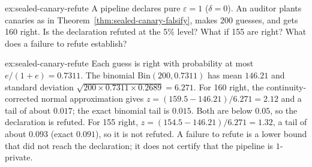 
\begin{pdexercise}[kind=Check,rating=2]{ex:sealed-canary-refute}
A pipeline declares pure $\varepsilon=1$ ($\delta=0$). An auditor plants
canaries as in Theorem~\ref{thm:sealed-canary-falsify}, makes 200 guesses, and
gets 160 right. Is the declaration refuted at the 5\% level? What if 155 are
right? What does a failure to refute establish?
\end{pdexercise}
\begin{pdsolution}{ex:sealed-canary-refute}
Each guess is right with probability at most $e/(1+e)=0.7311$. The binomial
$\mathrm{Bin}(200,0.7311)$ has mean $146.21$ and standard deviation
$\sqrt{200\times0.7311\times0.2689}=6.271$. For 160 right, the continuity-corrected
normal approximation gives $z=(159.5-146.21)/6.271=2.12$ and a tail of about
$0.017$; the exact binomial tail is $0.015$. Both are below $0.05$, so the
declaration is refuted. For 155 right, $z=(154.5-146.21)/6.271=1.32$, a tail
of about $0.093$ (exact $0.091$), so it is not refuted. A failure to refute is
a lower bound that did not reach the declaration; it does not certify that the
pipeline is $1$-private.
\end{pdsolution}
